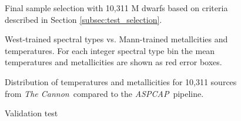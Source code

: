 \documentclass[modern]{aastex62}
\newcommand{\thecannon}{\textsl{The Cannon}}
\newcommand{\aspcap}{\textsl{ASPCAP}}
\begin{document}
\begin{figure}[ht]
\caption{Final sample selection with 10,311 M dwarfs based on criteria described in Section \ref{subsec:test_selection}. \label{fig:safe_selection}}
\end{figure}

\begin{figure}[ht]
\caption{West-trained spectral types vs. Mann-trained metallcities and temperatures. For each integer spectral type bin the mean temperatures and metallicities are shown as red error boxes. \label{fig:west_vs_mann}}
\end{figure}

\begin{figure}[ht]
\caption{Distribution of temperatures and metallicities for 10,311 sources from \thecannon\ compared to the \aspcap\ pipeline. \label{fig:aspcap_cannon_label_hist}}
\end{figure}

\begin{figure}[ht]
\caption{Validation test \label{fig:aspcap_cannon_validation}}
\end{figure}



\end{document}
